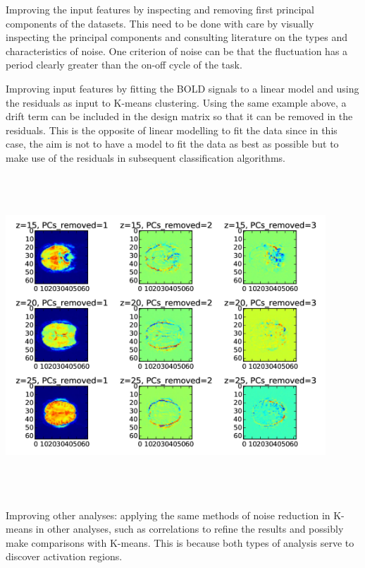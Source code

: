 \documentclass[11pt]{article}
\begin{document}
Improving the input features by inspecting and removing first principal
components of the datasets. This need to be done with care by visually
inspecting the principal components and consulting literature on the types and
characteristics of noise. One criterion of noise can be that the fluctuation has
a period clearly greater than the on-off cycle of the task. 

Improving input features by fitting the BOLD signals to a linear model and using
the residuals as input to K-means clustering. Using the same example above, a
drift term can be included in the design matrix so that it can be removed in the
residuals. This is the opposite of linear modelling to fit the data since in
this case, the aim is not to have a model to fit the data as best as possible
but to make use of the residuals in subsequent classification algorithms.

\centering
\includegraphics[width=12cm, height=12cm]{first_pcs_removed.jpg}

Improving other analyses: applying the same methods of noise reduction in
K-means in other analyses, 
such as correlations to refine the results and possibly make comparisons with
K-means. This is because both types of analysis serve to discover activation
regions. 
\end{document}
